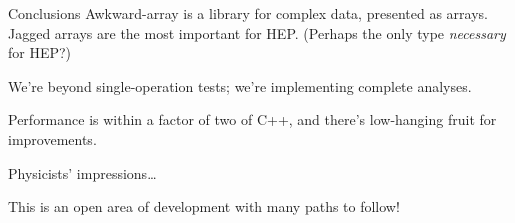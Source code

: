 \documentclass[aspectratio=169]{beamer}
\begin{document}
\begin{frame}{Conclusions}
\large
\vspace{0.5 cm}
Awkward-array is a library for complex data, presented as arrays. Jagged arrays are the most important for HEP. (Perhaps the only type {\it necessary} for HEP?)

\vspace{0.5 cm}
We're beyond single-operation tests; we're implementing complete analyses.

Performance is within a factor of two of C++, and there's low-hanging fruit for improvements.

\vspace{0.5 cm}
Physicists' impressions\ldots

\vspace{0.5 cm}
This is an open area of development with many paths to follow!
\end{frame}
\end{document}
